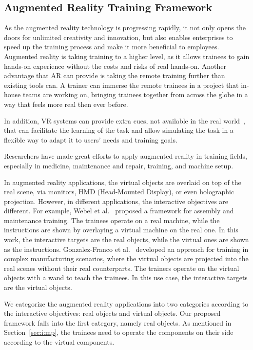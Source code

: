 \subsection{Augmented Reality Training Framework}

As the augmented reality technology is progressing rapidly, it not only opens the doors for unlimited creativity and innovation, but also enables enterprises to speed up the training process and make it more beneficial to employees.
Augmented reality is taking training to a higher level, as it allows trainees to gain hands-on experience without the costs and risks of real hands-on. Another advantage that AR can provide is taking the remote training further than existing tools can. A trainer can immerse the remote trainees in a project that in-house teams are working on, bringing trainees together from across the globe in a way that feels more real then ever before.

In addition, VR systems can provide extra cues, not available in the real world~\cite{gosselin2010}, that can facilitate the learning of the task and allow simulating the task in a flexible way to adapt it to users' needs and training goals.

Researchers have made great efforts to apply augmented reality in training fields, especially in medicine, maintenance and repair, training, and machine setup.

In augmented reality applications, the virtual objects are overlaid on top of the real scene, via monitors, HMD (Head-Mounted Display), or even holographic projection. However, in different applications, the interactive objectives are different. For example, Webel et al.~\cite{webel2011} proposed a framework for assembly and maintenance training. The trainees operate on a real machine, while the instructions are shown by overlaying a virtual machine on the real one. In this work, the interactive targets are the real objects, while the virtual ones are shown as the instructions. Gonzalez-Franco et al.~\cite{gonzalez-franco2016} developed an approach for training in complex manufacturing scenarios, where the virtual objects are projected into the real scenes without their real counterparts. The trainers operate on the virtual objects with a wand to teach the trainees. In this use case, the interactive targets are the virtual objects.

We categorize the augmented reality applications into two categories according to the interactive objectives: real objects and virtual objects. Our proposed framework falls into the first category, namely real objects. As mentioned in Section~\ref{sec:i:mp}, the trainees need to operate the components on their side according to the virtual components.

